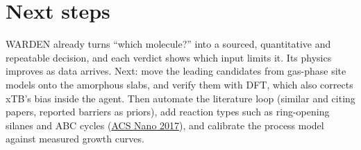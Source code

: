 \documentclass[10pt]{article}
\begin{document}
\section*{Next steps}
WARDEN already turns ``which molecule?'' into a sourced, quantitative and repeatable decision, and each verdict shows which input limits it. Its physics improves as data arrives. Next: move the leading candidates from gas-phase site models onto the amorphous slabs, and verify them with DFT, which also corrects xTB's bias inside the agent. Then automate the literature loop (similar and citing papers, reported barriers as priors), add reaction types such as ring-opening silanes and ABC cycles (\href{https://doi.org/10.1021/acsnano.7b04701}{ACS Nano 2017}), and calibrate the process model against measured growth curves.
\end{document}
